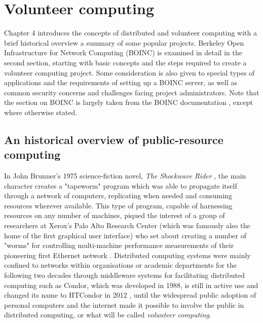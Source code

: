\chapter{Volunteer computing}
\vspace{-2em}
\minitoc

Chapter 4 introduces the concepts of distributed and volunteer computing with a brief historical overview  a summary of some popular projects.  Berkeley Open Infrastructure for Network Computing (BOINC) is examined in detail in the second section, starting with basic concepts and the steps required to create a volunteer computing project. Some consideration is also given to special types of applications and the requirements of setting up a BOINC server, as well as common security concerns and challenges facing project administrators. Note  that the section on BOINC is largely taken from the BOINC documentation \cite{boincwiki}, except where otherwise stated. 
 
\section{An historical overview of public-resource computing}
In John Brunner's 1975 science-fiction novel, \emph{The Shockwave Rider} \cite{brunner}, the main character creates a "tapeworm" program which was able to propagate itself through a network of computers, replicating when needed and consuming resources wherever available. This type of program, capable of harnessing resources on any number of machines, piqued the interest of a group of researchers at Xerox's Palo Alto Research Center (which was famously also the home of the first graphical user interface) who set about creating a number of "worms"   for controlling multi-machine performance measurements of their pioneering first Ethernet network \cite{worms}. 
Distributed computing systems  were mainly confined to networks within organisations or academic departments for the following two decades through middleware systems for facilitating distributed computing such as Condor, which was developed in 1988, is still in active use   and changed its name to HTCondor in 2012 \cite{condor}, until  the widespread public adoption of personal computers and the internet made it possible to involve the public in distributed computing, or what will be called \emph{volunteer computing}.

